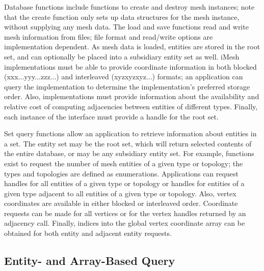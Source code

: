 Database functions include functions to create and destroy mesh instances;
note that the create function only sets up data structures for the
mesh instance, without supplying any mesh data. The load and save
functions read and write mesh information from files; file format
and read/write options are implementation dependent. As mesh data
is loaded, entities are stored in the root set, and can optionally
be placed into a subsidiary entity set as well. iMesh implementations
must be able to provide coordinate information in both blocked (xxx...yyy...zzz...)
and interleaved (xyzxyzxyz...) formats; an application can query the
implementation to determine the implementation's preferred storage
order. Also, implementations must provide information about the availability
and relative cost of computing adjacencies between entities of different
types. Finally, each instance of the interface must provide a handle
for the root set.

Set query functions allow an application to retrieve information about
entities in a set. The entity set may be the root set, which will
return selected contents of the entire database, or may be any subsidiary
entity set. For example, functions exist to request the number of
mesh entities of a given type or topology; the types and topologies
are defined as enumerations. Applications can request handles for
all entities of a given type or topology or handles for entities of
a given type adjacent to all entities of a given type or topology.
Also, vertex coordinates are available in either blocked or interleaved
order. Coordinate requests can be made for all vertices or for the
vertex handles returned by an adjacency call. Finally, indices into
the global vertex coordinate array can be obtained for both entity
and adjacent entity requests.


\subsection{Entity- and Array-Based Query\label{sub:Ent-Interface}}

